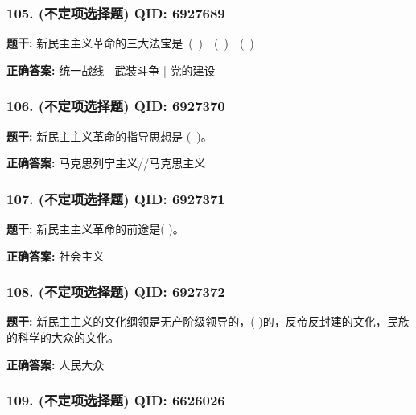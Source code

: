 \documentclass[12pt,UTF8]{ctexart}
\begin{document}
\subsubsection*{105. (不定项选择题) \small QID: 6927689}

\textbf{题干:}
新民主主义革命的三大法宝是 ( )  ( )  ( )

\textbf{正确答案:}
统一战线 | 武装斗争 | 党的建设

\vspace{0.3em}\hrulefill\vspace{0.7em}

\subsubsection*{106. (不定项选择题) \small QID: 6927370}

\textbf{题干:}
新民主主义革命的指导思想是 ( )。

\textbf{正确答案:}
马克思列宁主义//马克思主义

\vspace{0.3em}\hrulefill\vspace{0.7em}

\subsubsection*{107. (不定项选择题) \small QID: 6927371}

\textbf{题干:}
新民主主义革命的前途是(        )。

\textbf{正确答案:}
社会主义

\vspace{0.3em}\hrulefill\vspace{0.7em}

\subsubsection*{108. (不定项选择题) \small QID: 6927372}

\textbf{题干:}
新民主主义的文化纲领是无产阶级领导的，(      )的，反帝反封建的文化，民族的科学的大众的文化。

\textbf{正确答案:}
人民大众

\vspace{0.3em}\hrulefill\vspace{0.7em}

\subsubsection*{109. (不定项选择题) \small QID: 6626026}
\end{document}
